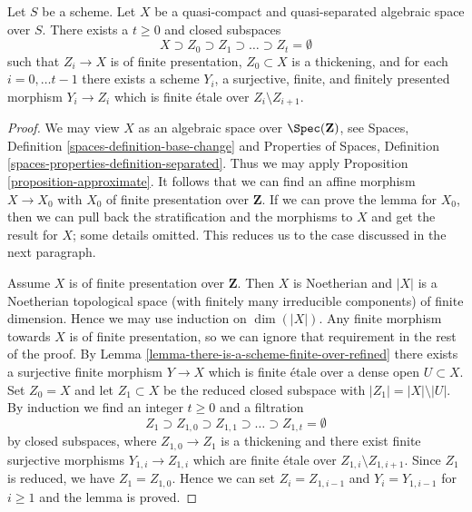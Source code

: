 \begin{lemma}
\label{lemma-there-is-a-scheme-finite-over-filtered}
Let $S$ be a scheme. Let $X$ be a quasi-compact and quasi-separated
algebraic space over $S$. There exists a $t \geq 0$ and closed
subspaces
$$
X \supset Z_0 \supset Z_1 \supset \ldots \supset Z_t = \emptyset
$$
such that $Z_i \to X$ is of finite presentation,
$Z_0 \subset X$ is a thickening, and for each $i = 0, \ldots t - 1$
there exists a scheme $Y_i$, a surjective, finite, and finitely
presented morphism $Y_i \to Z_i$ which is finite \'etale over
$Z_i \setminus Z_{i + 1}$.
\end{lemma}

\begin{proof}
We may view $X$ as an algebraic space over $\Spec(\mathbf{Z})$, see
Spaces, Definition \ref{spaces-definition-base-change} and
Properties of Spaces, Definition \ref{spaces-properties-definition-separated}.
Thus we may apply Proposition \ref{proposition-approximate}.
It follows that we can find an affine morphism $X \to X_0$
with $X_0$ of finite presentation over $\mathbf{Z}$.
If we can prove the lemma for $X_0$, then we can pull back
the stratification and the morphisms to $X$ and get the result for $X$;
some details omitted. This reduces us to the case discussed in the
next paragraph.

\medskip\noindent
Assume $X$ is of finite presentation over $\mathbf{Z}$.
Then $X$ is Noetherian and $|X|$ is a Noetherian topological
space (with finitely many irreducible components) of finite dimension.
Hence we may use induction on $\dim(|X|)$.
Any finite morphism towards $X$ is of finite presentation, so
we can ignore that requirement in the rest of the proof.
By Lemma \ref{lemma-there-is-a-scheme-finite-over-refined}
there exists a surjective finite morphism $Y \to X$ which is
finite \'etale over a dense open $U \subset X$.
Set $Z_0 = X$ and let $Z_1 \subset X$ be the reduced closed subspace
with $|Z_1| = |X| \setminus |U|$.
By induction we find an integer $t \geq 0$ and a filtration
$$
Z_1 \supset Z_{1, 0} \supset Z_{1, 1} \supset \ldots
\supset Z_{1, t} = \emptyset
$$
by closed subspaces, where $Z_{1, 0} \to Z_1$ is a thickening
and there exist finite surjective morphisms $Y_{1, i} \to Z_{1, i}$
which are finite \'etale over $Z_{1, i} \setminus Z_{1, i + 1}$.
Since $Z_1$ is reduced, we have $Z_1 = Z_{1, 0}$.
Hence we can set $Z_i = Z_{1, i - 1}$ and $Y_i = Y_{1, i - 1}$
for $i \geq 1$ and the lemma is proved.
\end{proof}












